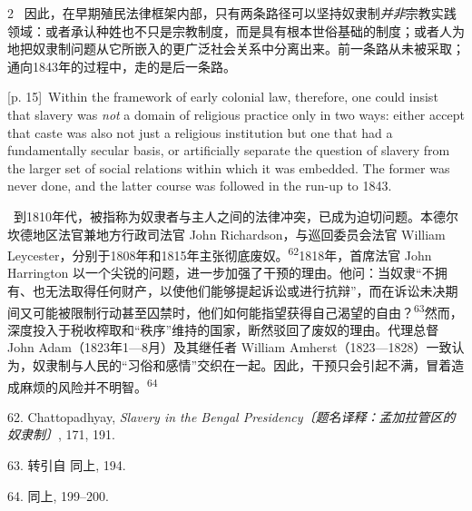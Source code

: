 \documentclass[10pt,a4paper]{article}
\begin{document}
\begin{paracol}{2}
\switchcolumn*
{\scriptsize\color{gray} [p. 15]}\ 因此，在早期殖民法律框架内部，只有两条路径可以坚持奴隶制\textit{并非}宗教实践领域：或者承认种姓也不只是宗教制度，而是具有根本世俗基础的制度；或者人为地把奴隶制问题从它所嵌入的更广泛社会关系中分离出来。前一条路从未被采取；通向1843年的过程中，走的是后一条路。\par
\switchcolumn
{\scriptsize\color{gray} [p. 15]}\ Within the framework of early colonial law, therefore, one could insist that slavery was \textit{not} a domain of religious practice only in two ways: either accept that caste was also not just a religious institution but one that had a fundamentally secular basis, or artificially separate the question of slavery from the larger set of social relations within which it was embedded. The former was never done, and the latter course was followed in the run-up to 1843.\par
\switchcolumn*
{\scriptsize\color{gray} [p. 15]}\ 到1810年代，被指称为奴隶者与主人之间的法律冲突，已成为迫切问题。本德尔坎德地区法官兼地方行政司法官 John Richardson，与巡回委员会法官 William Leycester，分别于1808年和1815年主张彻底废\mbox{奴。\textsuperscript{62}}1818年，首席法官 John Harrington 以一个尖锐的问题，进一步加强了干预的理由。他问：当奴隶“不拥有、也无法取得任何财产，以使他们能够提起诉讼或进行抗辩”，而在诉讼未决期间又可能被限制行动甚至囚禁时，他们如何能指望获得自己渴望的自\mbox{由？\textsuperscript{63}}然而，深度投入于税收榨取和“秩序”维持的国家，断然驳回了废奴的理由。代理总督 John Adam（1823年1—8月）及其继任者 William Amherst（1823—1828）一致认为，奴隶制与人民的“习俗和感情”交织在一起。因此，干预只会引起不满，冒着造成麻烦的风险并不明\mbox{智。\textsuperscript{64}}\par{\small 62. Chattopadhyay, \textit{Slavery in the Bengal Presidency〔题名译释：孟加拉管区的奴隶制〕}, 171, 191.\par}{\small 63. 转引自 同上, 194.\par}{\small 64. 同上, 199–200.\par}
\switchcolumn

\end{paracol}
\end{document}
